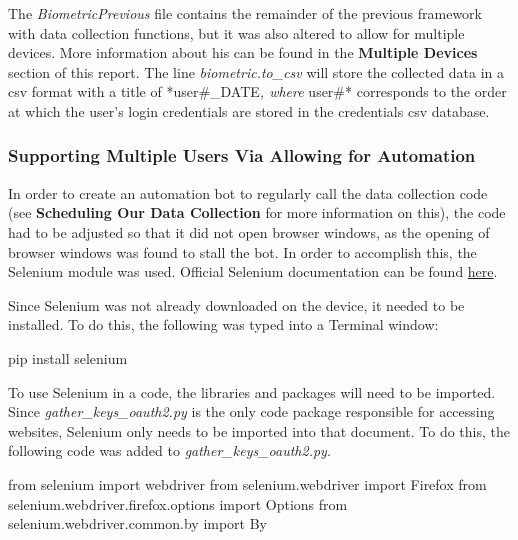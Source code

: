 \documentclass[]{book}
\newenvironment{Shaded}{\begin{snugshade}}{\end{snugshade}}
\newcommand{\ImportTok}[1]{#1}
\newcommand{\NormalTok}[1]{#1}
\begin{document}
The \emph{BiometricPrevious} file contains the remainder of the previous framework with data collection functions, but it was also altered to allow for multiple devices. More information about his can be found in the \textbf{Multiple Devices} section of this report.
The line \emph{biometric.to\_csv} will store the collected data in a csv format with a title of *user\#\_DATE\emph{, where }user\#* corresponds to the order at which the user's login credentials are stored in the credentials csv database.

\hypertarget{supporting-multiple-users-via-allowing-for-automation}{%
\subsubsection{Supporting Multiple Users Via Allowing for Automation}\label{supporting-multiple-users-via-allowing-for-automation}}

In order to create an automation bot to regularly call the data collection code (see \textbf{Scheduling Our Data Collection} for more information on this), the code had to be adjusted so that it did not open browser windows, as the opening of browser windows was found to stall the bot. In order to accomplish this, the Selenium module was used. Official Selenium documentation can be found \href{https://selenium-python.readthedocs.io}{here}.

Since Selenium was not already downloaded on the device, it needed to be installed. To do this, the following was typed into a Terminal window:

\begin{Shaded}
\begin{Highlighting}[]
\NormalTok{pip install selenium}
\end{Highlighting}
\end{Shaded}

To use Selenium in a code, the libraries and packages will need to be imported. Since \emph{gather\_keys\_oauth2.py} is the only code package responsible for accessing websites, Selenium only needs to be imported into that document. To do this, the following code was added to \emph{gather\_keys\_oauth2.py}.

\begin{Shaded}
\begin{Highlighting}[]
\ImportTok{from}\NormalTok{ selenium }\ImportTok{import}\NormalTok{ webdriver}
\ImportTok{from}\NormalTok{ selenium.webdriver }\ImportTok{import}\NormalTok{ Firefox}
\ImportTok{from}\NormalTok{ selenium.webdriver.firefox.options }\ImportTok{import}\NormalTok{ Options}
\ImportTok{from}\NormalTok{ selenium.webdriver.common.by }\ImportTok{import}\NormalTok{ By}
\end{Highlighting}
\end{Shaded}
\end{document}
